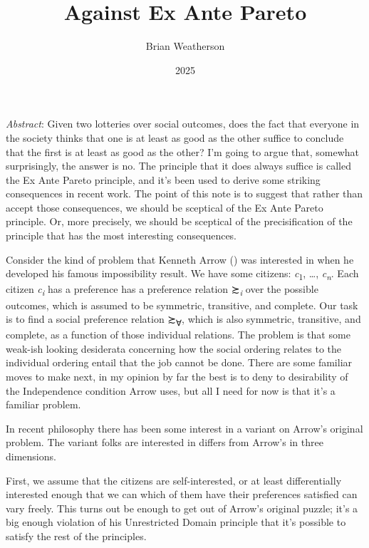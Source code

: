 \documentclass[
  11pt,
  letterpaper,
  DIV=11,
  numbers=noendperiod,
  twoside]{scrartcl}
\title{Against Ex Ante Pareto}
\author{Brian Weatherson}
\date{2025}
\renewenvironment{abstract}
 {\vspace{-1.25cm}
 \quotation\small\noindent\emph{Abstract}:}
 {\endquotation}
\begin{document}
\maketitle
\begin{abstract}
Given two lotteries over social outcomes, does the fact that everyone in
the society thinks that one is at least as good as the other suffice to
conclude that the first is at least as good as the other? I'm going to
argue that, somewhat surprisingly, the answer is no. The principle that
it does always suffice is called the Ex Ante Pareto principle, and it's
been used to derive some striking consequences in recent work. The point
of this note is to suggest that rather than accept those consequences,
we should be sceptical of the Ex Ante Pareto principle. Or, more
precisely, we should be sceptical of the precisification of the
principle that has the most interesting consequences.
\end{abstract}


Consider the kind of problem that Kenneth Arrow
() was interested in when he developed his
famous impossibility result. We have some citizens:
\emph{c}\textsubscript{1}, \ldots, \emph{c\textsubscript{n}}. Each
citizen \emph{c\textsubscript{i}} has a preference has a preference
relation ≿\textsubscript{\emph{i}} over the possible outcomes, which is
assumed to be symmetric, transitive, and complete. Our task is to find a
social preference relation ≿\textsubscript{∀}, which is also symmetric,
transitive, and complete, as a function of those individual relations.
The problem is that some weak-ish looking desiderata concerning how the
social ordering relates to the individual ordering entail that the job
cannot be done. There are some familiar moves to make next, in my
opinion by far the best is to deny to desirability of the Independence
condition Arrow uses, but all I need for now is that it's a familiar
problem.

In recent philosophy there has been some interest in a variant on
Arrow's original problem. The variant folks are interested in differs
from Arrow's in three dimensions.

First, we assume that the citizens are self-interested, or at least
differentially interested enough that we can which of them have their
preferences satisfied can vary freely. This turns out be enough to get
out of Arrow's original puzzle; it's a big enough violation of his
Unrestricted Domain principle that it's possible to satisfy the rest of
the principles.
\end{document}
